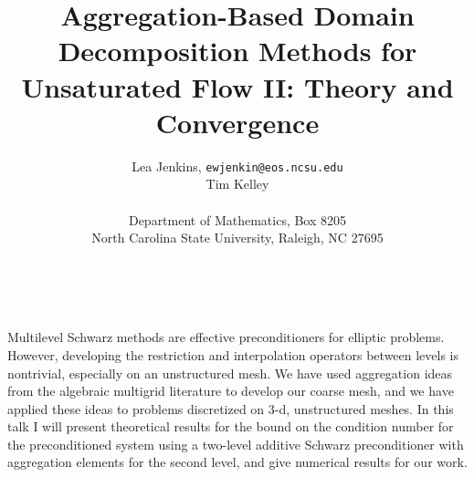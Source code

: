 \documentclass[11pt]{article}
\date{ ~ \hspace{-4mm}}
\title{Aggregation-Based Domain Decomposition Methods for Unsaturated Flow II: Theory and Convergence  }
\author{Lea Jenkins, {\tt ewjenkin@eos.ncsu.edu} \\  Tim Kelley  \\  \\ Department of Mathematics, Box 8205 \\ North Carolina State University, Raleigh, NC  27695}
\begin{document}
\maketitle
\thispagestyle{empty}





 



Multilevel Schwarz methods are effective preconditioners for elliptic
problems.  However, developing the restriction and interpolation operators
between levels is nontrivial, especially on an unstructured mesh.  We have used
aggregation ideas from the algebraic multigrid literature to develop our coarse
mesh, and we have applied these ideas to problems discretized on 3-d,
unstructured meshes.  In this talk I will present theoretical results for the
bound on the condition number for the preconditioned system using a two-level
additive Schwarz preconditioner with aggregation elements for the second level,
and give numerical results for our work.
\end{document}
